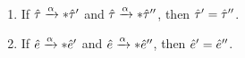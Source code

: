 \documentclass[formalism.tex]{subfiles}
\begin{document}
\begin{theorem}[name=Determinism] \
  \begin{enumerate}
    \item If $\hat{\tau} \xrightarrow{\alpha}* \hat{\tau}'$ and $\hat{\tau} \xrightarrow{\alpha}* \hat{\tau}''$, then
      $\hat{\tau}' = \hat{\tau}''$.

    \item If $\hat{e} \xrightarrow{\alpha}* \hat{e}'$ and $\hat{e} \xrightarrow{\alpha}* \hat{e}''$, then
      $\hat{e}' = \hat{e}''$.
  \end{enumerate}
\end{theorem}


\end{document}
